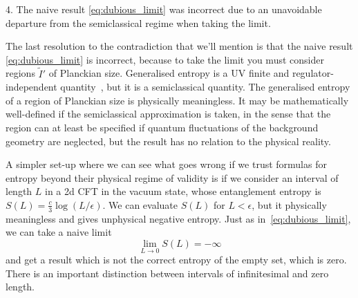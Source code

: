 \documentclass[a4paper,11pt]{article}
\newcommand{\cts}[1]{\ignorespaces}
\def\bne{\begin{equation}}
\def\ene{\end{equation}}
\begin{document}


\fi

\vspace{3mm}
4. The naive result \eqref{eq:dubious_limit} was incorrect due to an unavoidable departure from the semiclassical regime when taking the limit. 
\vspace{3mm}

The last resolution to the contradiction that we'll mention is that the naive result \eqref{eq:dubious_limit} is incorrect, because to take the limit you must consider regions $\tilde I'$ of Planckian size. Generalised entropy is a UV finite and regulator-independent quantity~\cite{Bianchi2012, Cooperman2013}, but it is a semiclassical quantity. The generalised entropy of a region of Planckian size is physically meaningless. It may be  mathematically well-defined if the semiclassical approximation is taken, in the sense that the region can at least be specified if quantum fluctuations of the background geometry are neglected, but the result has no relation to the physical reality. 

A simpler set-up where we can see what goes wrong if we trust formulas for entropy beyond their physical regime of validity is if we consider an interval of length $L$ in a 2d CFT in the vacuum state, whose entanglement entropy is $S(L) = \frac{c}{3} \log (L/\epsilon)$. We can evaluate $S(L)$ for $L< \epsilon$, but it physically meaningless and gives unphysical negative entropy. Just as in~\eqref{eq:dubious_limit}, we can take a naive limit 
\bne \lim_{L \to 0} S(L) = -\infty \ene
and get a result which is not the correct entropy of the empty set, which is zero. There is an important distinction between intervals of infinitesimal and zero length.
\end{document}
